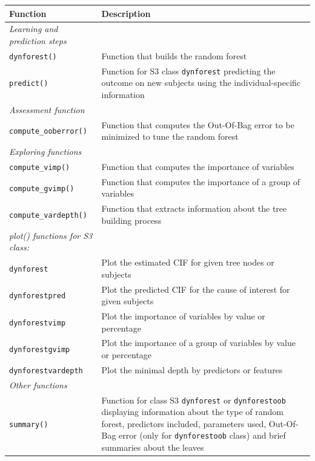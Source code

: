 \begin{longtable}[]{@{}
  >{\raggedright\arraybackslash}p{}
  >{\raggedright\arraybackslash}p{}@{}}
\toprule\noalign{}
\begin{minipage}[b]{\linewidth}\raggedright
Function
\end{minipage} & \begin{minipage}[b]{\linewidth}\raggedright
Description
\end{minipage} \\
\midrule\noalign{}
\endhead
\bottomrule\noalign{}
\endlastfoot
\emph{Learning and prediction steps} & \\
\texttt{dynforest()} & Function that builds the random forest \\
\texttt{predict()} & Function for S3 class \texttt{dynforest} predicting the outcome on new subjects using the individual-specific information \\
\emph{Assessment function} & \\
\texttt{compute\_ooberror()} & Function that computes the Out-Of-Bag error to be minimized to tune the random forest \\
\emph{Exploring functions} & \\
\texttt{compute\_vimp()} & Function that computes the importance of variables \\
\texttt{compute\_gvimp()} & Function that computes the importance of a group of variables \\
\texttt{compute\_vardepth()} & Function that extracts information about the tree building process \\
\emph{plot() functions for S3 class:} & \\
\texttt{dynforest} & Plot the estimated CIF for given tree nodes or subjects \\
\texttt{dynforestpred} & Plot the predicted CIF for the cause of interest for given subjects \\
\texttt{dynforestvimp} & Plot the importance of variables by value or percentage \\
\texttt{dynforestgvimp} & Plot the importance of a group of variables by value or percentage \\
\texttt{dynforestvardepth} & Plot the minimal depth by predictors or features \\
\emph{Other functions} & \\
\texttt{summary()} & Function for class S3 \texttt{dynforest} or \texttt{dynforestoob} displaying information about the type of random forest, predictors included, parameters used, Out-Of-Bag error (only for \texttt{dynforestoob} class) and brief summaries about the leaves \\

\end{longtable}
